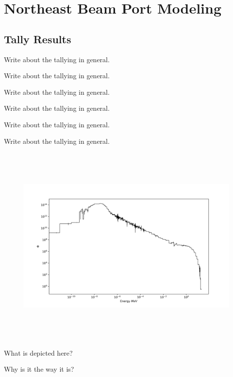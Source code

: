 
\cleardoublepage


\chapter{Northeast Beam Port Modeling}


\section{Tally Results}

Write about the tallying in general.

Write about the tallying in general.

Write about the tallying in general.

Write about the tallying in general.

Write about the tallying in general.

Write about the tallying in general.

%
\begin{figure}[htb]
\centering
\includegraphics[height=4in]{tex/figures/flux_erg.png}
\caption[]{}
\label{fig:}
\end{figure}

What is depicted here?

Why is it the way it is?

\clearpage

